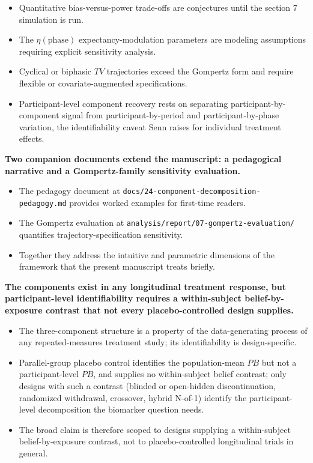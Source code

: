 \documentclass[
  11pt,
]{article}
\begin{document}
\begin{itemize}\setlength{\itemsep}{2pt}\setlength{\parskip}{0pt}
\item Quantitative bias-versus-power trade-offs are conjectures until the section 7 simulation is run.
\item The $\eta(\text{phase})$ expectancy-modulation parameters are modeling assumptions requiring explicit sensitivity analysis.
\item Cyclical or biphasic $TV$ trajectories exceed the Gompertz form and require flexible or covariate-augmented specifications.
\item Participant-level component recovery rests on separating participant-by-component signal from participant-by-period and participant-by-phase variation, the identifiability caveat Senn raises for individual treatment effects.
\end{itemize}

\textbf{Two companion documents extend the manuscript: a pedagogical narrative and a Gompertz-family sensitivity evaluation.}

\begin{itemize}\setlength{\itemsep}{2pt}\setlength{\parskip}{0pt}
\item The pedagogy document at \texttt{docs/24-component-decomposition-pedagogy.md} provides worked examples for first-time readers.
\item The Gompertz evaluation at \texttt{analysis/report/07-gompertz-evaluation/} quantifies trajectory-specification sensitivity.
\item Together they address the intuitive and parametric dimensions of the framework that the present manuscript treats briefly.
\end{itemize}

\textbf{The components exist in any longitudinal treatment response, but participant-level identifiability requires a within-subject belief-by-exposure contrast that not every placebo-controlled design supplies.}

\begin{itemize}\setlength{\itemsep}{2pt}\setlength{\parskip}{0pt}
\item The three-component structure is a property of the data-generating process of any repeated-measures treatment study; its identifiability is design-specific.
\item Parallel-group placebo control identifies the population-mean $PB$ but not a participant-level $PB$, and supplies no within-subject belief contrast; only designs with such a contrast (blinded or open-hidden discontinuation, randomized withdrawal, crossover, hybrid N-of-1) identify the participant-level decomposition the biomarker question needs.
\item The broad claim is therefore scoped to designs supplying a within-subject belief-by-exposure contrast, not to placebo-controlled longitudinal trials in general.
\end{itemize}
\end{document}
